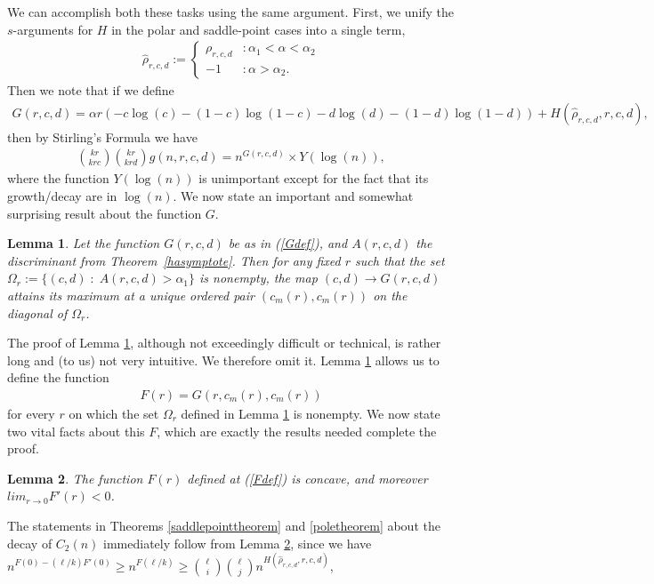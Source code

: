 \documentclass[proceedings]{aofa}
\newtheorem{lemma}{Lemma}
\newcommand{\rhoh}{\hat{\rho}}
\begin{document}
We can accomplish both these tasks using the same argument. First, we unify the $s$-arguments for $H$ in the polar and saddle-point cases into a single term,
\begin{align}\label{rhohdef}
\rhoh_{r,c,d} := \begin{cases} \rho_{r,c,d} &: \alpha_{1} < \alpha < \alpha_{2}\\
-1 &: \alpha > \alpha_{2}.\end{cases}
\end{align}
Then we note that if we define
\begin{align}\label{Gdef}
G(r,c,d)=\alpha r (-c\log(c)-(1-c)\log(1-c)-d\log(d)-(1-d)\log(1-d)) + H(\rhoh_{r,c,d},r,c,d),
\end{align}
then by Stirling's Formula we have 
\begin{align*}
{kr \choose krc}{kr \choose krd}g(n,r,c,d)=n^{G(r,c,d)} \times Y(\log(n)),
\end{align*}
where the function $Y(\log(n))$ is unimportant except for the fact that its growth/decay are in $\log(n)$. We now state an important and somewhat surprising result about the function $G$.
\begin{lemma}\label{maxlemma}
Let the function $G(r,c,d)$ be as in (\ref{Gdef}), and  $A(r,c,d)$ the discriminant from Theorem~\ref{hasymptote}. Then for any fixed $r$ such that the set\; $\Omega_{r}:=\{(c,d)\;:\;A(r,c,d)>\alpha_{1}\}$ is nonempty, the map $(c,d) \rightarrow G(r,c,d)$ attains its maximum at a unique ordered pair $(c_{m}(r),c_{m}(r))$ on the diagonal of $\Omega_{r}$. 
\end{lemma}
The proof of Lemma \ref{maxlemma}, although not exceedingly difficult or technical, is rather long and (to us) not very intuitive. We therefore omit it.
Lemma \ref{maxlemma} allows us to define the function
\begin{align}\label{Fdef}
F(r)=G(r,c_{m}(r),c_{m}(r))
\end{align}
for every $r$ on which the set $\Omega_{r}$ defined in Lemma \ref{maxlemma} is nonempty. We now state two vital facts about this $F$, which are exactly the results needed complete the proof.
\begin{lemma}\label{Flemma}
The function $F(r)$ defined at (\ref{Fdef}) is concave, and moreover $lim_{r \rightarrow 0}F'(r)<0$.
\end{lemma}
The statements in Theorems \ref{saddlepointtheorem} and \ref{poletheorem} about the decay of $C_{2}(n)$ immediately follow from Lemma \ref{Flemma}, since we have
$n^{F(0)-(\ell/k)F'(0)} \geq n^{F(\ell/k)} \geq {\ell \choose i}{\ell \choose j}n^{H(\rhoh_{r,c,d},r,c,d)}$,
\end{document}
